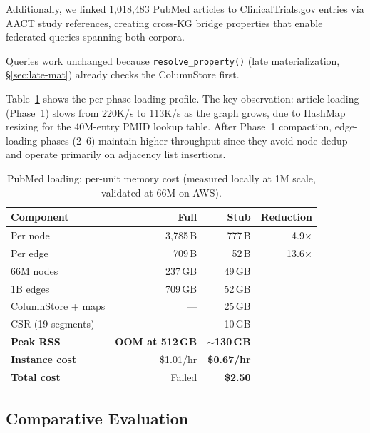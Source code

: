 \documentclass[sigconf, nonacm]{acmart}
\begin{document}
Additionally, we linked 1,018,483 PubMed articles to ClinicalTrials.gov entries via AACT study references, creating cross-KG bridge properties that enable federated queries spanning both corpora.

Queries work unchanged because \texttt{resolve\_property()} (late materialization, \S\ref{sec:late-mat}) already checks the ColumnStore first.

Table~\ref{tab:pubmed-phases} shows the per-phase loading profile.
The key observation: article loading (Phase~1) slows from 220K/s to 113K/s as the graph grows, due to HashMap resizing for the 40M-entry PMID lookup table.
After Phase~1 compaction, edge-loading phases (2--6) maintain higher throughput since they avoid node dedup and operate primarily on adjacency list insertions.

\begin{table}[h]
\caption{PubMed loading: per-unit memory cost (measured locally at 1M scale, validated at 66M on AWS).}
\label{tab:pubmed-phases}
\begin{tabular}{lrrr}
\toprule
\textbf{Component} & \textbf{Full} & \textbf{Stub} & \textbf{Reduction} \\
\midrule
Per node & 3,785\,B & 777\,B & 4.9$\times$ \\
Per edge & 709\,B & 52\,B & 13.6$\times$ \\
\midrule
66M nodes & 237\,GB & 49\,GB & \\
1B edges & 709\,GB & 52\,GB & \\
ColumnStore + maps & --- & 25\,GB & \\
CSR (19 segments) & --- & 10\,GB & \\
\midrule
\textbf{Peak RSS} & \textbf{OOM at 512\,GB} & \textbf{${\sim}$130\,GB} & \\
\textbf{Instance cost} & \$1.01/hr & \textbf{\$0.67/hr} & \\
\textbf{Total cost} & Failed & \textbf{\$2.50} & \\
\bottomrule
\end{tabular}
\end{table}

\subsection{Comparative Evaluation}
\label{sec:comparison}
\end{document}
